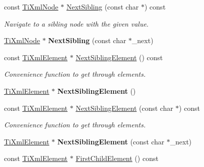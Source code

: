 \begin{DoxyCompactItemize}
\item 
const \hyperlink{class_ti_xml_node}{Ti\+Xml\+Node} $\ast$ \hyperlink{class_ti_xml_node_acaf9dc17531ac041f602f9ad579573ea}{Next\+Sibling} (const char $\ast$) const \hypertarget{class_ti_xml_node_acaf9dc17531ac041f602f9ad579573ea}{}\label{class_ti_xml_node_acaf9dc17531ac041f602f9ad579573ea}

\begin{DoxyCompactList}\small\item\em Navigate to a sibling node with the given \textquotesingle{}value\textquotesingle{}. \end{DoxyCompactList}\item 
\hyperlink{class_ti_xml_node}{Ti\+Xml\+Node} $\ast$ {\bfseries Next\+Sibling} (const char $\ast$\+\_\+next)\hypertarget{class_ti_xml_node_a4080bc5cc8a5c139e7cf308669e850fc}{}\label{class_ti_xml_node_a4080bc5cc8a5c139e7cf308669e850fc}

\item 
const \hyperlink{class_ti_xml_element}{Ti\+Xml\+Element} $\ast$ \hyperlink{class_ti_xml_node_a7667217e269e0da01d1f82aee94d1a3d}{Next\+Sibling\+Element} () const 
\begin{DoxyCompactList}\small\item\em Convenience function to get through elements. \end{DoxyCompactList}\item 
\hyperlink{class_ti_xml_element}{Ti\+Xml\+Element} $\ast$ {\bfseries Next\+Sibling\+Element} ()\hypertarget{class_ti_xml_node_a1b211cb5034655a04358e0e2f6fc5010}{}\label{class_ti_xml_node_a1b211cb5034655a04358e0e2f6fc5010}

\item 
const \hyperlink{class_ti_xml_element}{Ti\+Xml\+Element} $\ast$ \hyperlink{class_ti_xml_node_a3d7897999f99cf4870dd59df6331d7ff}{Next\+Sibling\+Element} (const char $\ast$) const 
\begin{DoxyCompactList}\small\item\em Convenience function to get through elements. \end{DoxyCompactList}\item 
\hyperlink{class_ti_xml_element}{Ti\+Xml\+Element} $\ast$ {\bfseries Next\+Sibling\+Element} (const char $\ast$\+\_\+next)\hypertarget{class_ti_xml_node_a6e1ac6b800e18049bc75e9f8e63a8e5f}{}\label{class_ti_xml_node_a6e1ac6b800e18049bc75e9f8e63a8e5f}

\item 
const \hyperlink{class_ti_xml_element}{Ti\+Xml\+Element} $\ast$ \hyperlink{class_ti_xml_node_ab1f8d8e70d88aea4c5efedfe00862d55}{First\+Child\+Element} () const \hypertarget{class_ti_xml_node_ab1f8d8e70d88aea4c5efedfe00862d55}{}\label{class_ti_xml_node_ab1f8d8e70d88aea4c5efedfe00862d55}


\end{DoxyCompactItemize}
